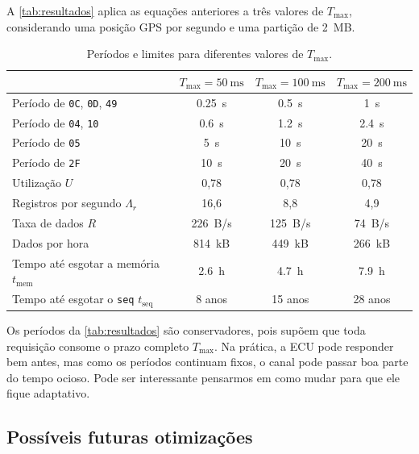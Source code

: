 \documentclass[12pt]{article}
\begin{document}
A \autoref{tab:resultados} aplica as equações anteriores a três valores de $T_{\max}$, considerando uma posição GPS por segundo e uma partição de \SI{2}{MB}.
 
\begin{table}[htbp]
  \centering
  \caption{Períodos e limites para diferentes valores de $T_{\max}$.}
  \label{tab:resultados}
  \begin{tabular}{lccc}
    \toprule
    & $T_{\max} = \SI{50}{\milli\second}$ & $T_{\max} = \SI{100}{\milli\second}$ & $T_{\max} = \SI{200}{\milli\second}$ \\
    \midrule
    Período de \texttt{0C}, \texttt{0D}, \texttt{49} & \SI{0.25}{\second} & \SI{0.5}{\second} & \SI{1}{\second} \\
    Período de \texttt{04}, \texttt{10}              & \SI{0.6}{\second} & \SI{1.2}{\second} & \SI{2.4}{\second} \\
    Período de \texttt{05}                           & \SI{5}{\second}   & \SI{10}{\second}  & \SI{20}{\second} \\
    Período de \texttt{2F}                           & \SI{10}{\second}  & \SI{20}{\second}  & \SI{40}{\second} \\
    \midrule
    Utilização $U$                        & 0{,}78 & 0{,}78 & 0{,}78 \\
    Registros por segundo $\Lambda_r$     & 16{,}6 & 8{,}8  & 4{,}9 \\
    Taxa de dados $R$                     & \SI{226}{B/s} & \SI{125}{B/s} & \SI{74}{B/s} \\
    Dados por hora                        & \SI{814}{kB}  & \SI{449}{kB}  & \SI{266}{kB} \\
    Tempo até esgotar a memória $t_{\mathrm{mem}}$ & \SI{2.6}{h} & \SI{4.7}{h} & \SI{7.9}{h} \\
    Tempo até esgotar o \texttt{seq} $t_{\mathrm{seq}}$ & 8 anos & 15 anos & 28 anos \\
    \bottomrule
  \end{tabular}
\end{table}

Os períodos da \autoref{tab:resultados} são conservadores, pois supõem que toda requisição consome o prazo completo $T_{\max}$. Na prática, a ECU pode responder bem antes, mas como os períodos continuam fixos, o canal pode passar boa parte do tempo ocioso. Pode ser interessante pensarmos em como mudar para que ele fique adaptativo.

\subsection{Possíveis futuras otimizações}
\end{document}
